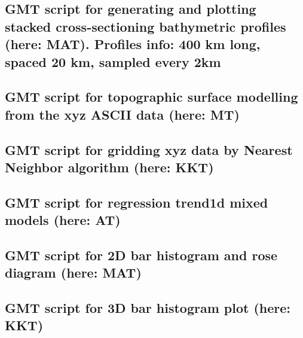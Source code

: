 \documentclass[11pt,a4paper]{report}
\begin{document}
{\begin{appendices}
\subsection{GMT script for generating and plotting stacked cross-sectioning bathymetric profiles (here: MAT). Profiles info: 400 km long, spaced 20 km, sampled every 2km}\label{GMT:08}

\pagebreak

\subsection{GMT script for topographic surface modelling from the xyz ASCII data (here: MT)}\label{GMT:09}

\pagebreak

\subsection{GMT script for gridding xyz data by Nearest Neighbor algorithm (here: KKT)}\label{GMT:10}

\pagebreak

\subsection{GMT script for regression trend1d mixed models (here: AT)}\label{GMT:11}

\pagebreak

\subsection{GMT script for 2D bar histogram and rose diagram (here: MAT)}\label{GMT:12}

\pagebreak

\subsection{GMT script for 3D bar histogram plot (here: KKT)}\label{GMT:13}


\vspace{1.5em}

\pagebreak

\end{appendices}}
\end{document}
